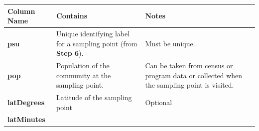 \documentclass[12pt,a4paper]{book}
\theoremstyle{definition}
\theoremstyle{definition}
\theoremstyle{definition}
\theoremstyle{remark}
\begin{document}
\begin{longtable}[]{@{}lll@{}}
\toprule
\begin{minipage}[b]{0.19\columnwidth}\raggedright
\textbf{Column Name}\strut
\end{minipage} & \begin{minipage}[b]{0.36\columnwidth}\raggedright
\textbf{Contains}\strut
\end{minipage} & \begin{minipage}[b]{0.36\columnwidth}\raggedright
\textbf{Notes}\strut
\end{minipage}\tabularnewline
\midrule
\endhead
\begin{minipage}[t]{0.19\columnwidth}\raggedright
\textbf{psu}\strut
\end{minipage} & \begin{minipage}[t]{0.36\columnwidth}\raggedright
Unique identifying label for a sampling point (from \textbf{Step
6}).\strut
\end{minipage} & \begin{minipage}[t]{0.36\columnwidth}\raggedright
Must be unique.\strut
\end{minipage}\tabularnewline
\begin{minipage}[t]{0.19\columnwidth}\raggedright
\textbf{pop}\strut
\end{minipage} & \begin{minipage}[t]{0.36\columnwidth}\raggedright
Population of the community at the sampling point.\strut
\end{minipage} & \begin{minipage}[t]{0.36\columnwidth}\raggedright
Can be taken from census or program data or collected when the sampling
point is visited.\strut
\end{minipage}\tabularnewline
\begin{minipage}[t]{0.19\columnwidth}\raggedright
\textbf{latDegrees}\strut
\end{minipage} & \begin{minipage}[t]{0.36\columnwidth}\raggedright
Latitude of the sampling point\strut
\end{minipage} & \begin{minipage}[t]{0.36\columnwidth}\raggedright
Optional\strut
\end{minipage}\tabularnewline
\begin{minipage}[t]{0.19\columnwidth}\raggedright
\textbf{latMinutes}\strut
\end{minipage} & \begin{minipage}[t]{0.36\columnwidth}\raggedright

\end{minipage}
\end{longtable}
\end{document}
